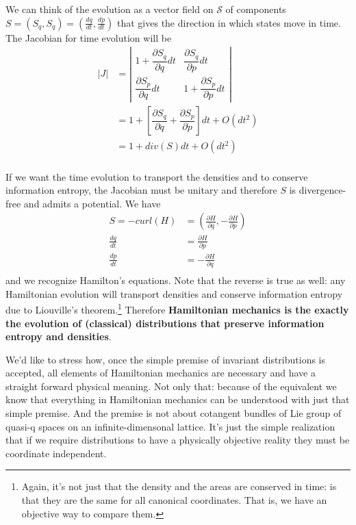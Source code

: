 \documentclass[11pt]{article}
\begin{document}
We can think of the evolution as a vector field on $\mathcal{S}$ of components $S = (S_q, S_q) = (\frac{dq}{dt}, \frac{dp}{dt})$ that gives the direction in which states move in time. The Jacobian for time evolution will be
\begin{equation}
\label{Jacobian_evolution}
\begin{aligned}
|J| &= \left| \begin{matrix}
1 + \dfrac{\partial S_q}{\partial q}dt & \dfrac{\partial S_q}{\partial p} dt \\[2.2ex]
\dfrac{\partial S_p}{\partial q}  dt & 1 + \dfrac{\partial S_p}{\partial p} dt \end{matrix} \right| \\
&= 1 + \left[ \dfrac{\partial S_q}{\partial q} + \dfrac{\partial S_p}{\partial p} \right]dt + O(dt^2)\\
&= 1 + div(S)dt + O(dt^2)\\
\end{aligned}
\end{equation}

If we want the time evolution to transport the densities and to conserve information entropy, the Jacobian must be unitary and therefore $S$ is divergence-free and admits a potential. We have
\begin{equation}
\label{Potential_Hamilton}
\begin{aligned}
S = - curl(H) &= (\frac{\partial H}{\partial q}, - \frac{\partial H}{\partial p}) \\
\frac{dq}{dt} &= \frac{\partial H}{\partial p}  \\
\frac{dp}{dt} &= - \frac{\partial H}{\partial q}  \\
\end{aligned}
\end{equation}
and we recognize Hamilton's equations. Note that the reverse is true as well: any Hamiltonian evolution will transport densities and conserve information entropy due to Liouville's theorem.\footnote{Again, it's not just that the density and the areas are conserved in time: is that they are the same for all canonical coordinates. That is, we have an objective way to compare them.} Therefore \textbf{Hamiltonian mechanics is the exactly the evolution of (classical) distributions that preserve information entropy and densities}.

We'd like to stress how, once the simple premise of invariant distributions is accepted, all elements of Hamiltonian mechanics are necessary and have a straight forward physical meaning. Not only that: because of the equivalent we know that everything in Hamiltonian mechanics can be understood with just that simple premise. And the premise is not about cotangent bundles of Lie group of quasi-q spaces on an infinite-dimensonal lattice. It's just the simple realization that if we require distributions to have a physically objective reality they must be coordinate independent.
\end{document}
